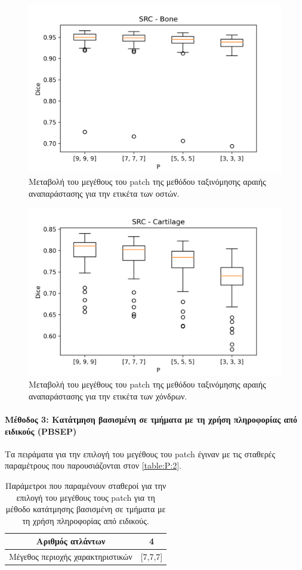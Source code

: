 \documentclass[a4paper,12pt]{article}
\newcommand{\paragraphLine}[1]{\paragraph{#1}\mbox{}}
\begin{document}
\begin{figure}[H]
    \centering
    \includegraphics[width=0.85\linewidth]{SRC_P_Bone_plot.png}
    \caption{Μεταβολή του μεγέθους του patch της μεθόδου ταξινόμησης αραιής
             αναπαράστασης για την ετικέτα των οστών.}
    \label{fig:SRC:P:2}
\end{figure}

\begin{figure}[H]
    \centering
    \includegraphics[width=0.85\linewidth]{SRC_P_Cartilage_plot.png}
    \caption{Μεταβολή του μεγέθους του patch της μεθόδου ταξινόμησης αραιής
             αναπαράστασης για την ετικέτα των χόνδρων.}
    \label{fig:SRC:P:3}
\end{figure}

\paragraphLine{Μέθοδος 3: Κατάτμηση βασισμένη σε τμήματα με τη χρήση πληροφορίας
από ειδικούς (PBSEP)}

Τα πειράματα για την επιλογή του μεγέθους του patch έγιναν με τις σταθερές
παραμέτρους που παρουσιάζονται στον \autoref{table:P:2}.

\begin{table}[h!]
    \centering
    \begin{tabular}{|c|c|} 
        \hline
        Αριθμός ατλάντων & 4 \\ 
        \hline
        Μέγεθος περιοχής χαρακτηριστικών & [7,7,7] \\ 
        \hline
    \end{tabular}
    \caption{Παράμετροι που παραμένουν σταθεροί για την επιλογή του μεγέθους
             τους patch για τη μέθοδο κατάτμησης βασισμένη σε τμήματα με τη
             χρήση πληροφορίας από ειδικούς.}
    \label{table:P:2}
\end{table}
\end{document}
